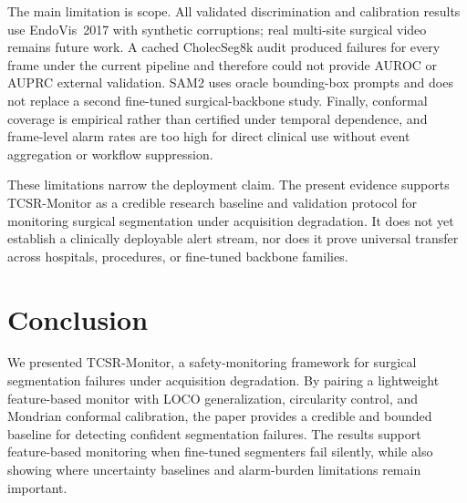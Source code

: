 \documentclass[runningheads]{llncs}
\newcommand{\monitor}{TCSR-Monitor}
\begin{document}
The main limitation is scope. All validated discrimination and calibration
results use EndoVis~2017 with synthetic corruptions; real multi-site surgical
video remains future work. A cached CholecSeg8k audit produced failures for
every frame under the current pipeline and therefore could not provide AUROC or
AUPRC external validation. SAM2 uses oracle bounding-box prompts and does not
replace a second fine-tuned surgical-backbone study. Finally, conformal
coverage is empirical rather than certified under temporal dependence, and
frame-level alarm rates are too high for direct clinical use without event
aggregation or workflow suppression.

These limitations narrow the deployment claim. The present evidence supports
\monitor{} as a credible research baseline and validation protocol for
monitoring surgical segmentation under acquisition degradation. It does not yet
establish a clinically deployable alert stream, nor does it prove universal
transfer across hospitals, procedures, or fine-tuned backbone families.

\section{Conclusion}

We presented \monitor{}, a safety-monitoring framework for surgical
segmentation failures under acquisition degradation. By pairing a lightweight
feature-based monitor with LOCO generalization, circularity control, and
Mondrian conformal calibration, the paper provides a credible and bounded
baseline for detecting confident segmentation failures. The results support
feature-based monitoring when fine-tuned segmenters fail silently, while also
showing where uncertainty baselines and alarm-burden limitations remain
important.
\end{document}
